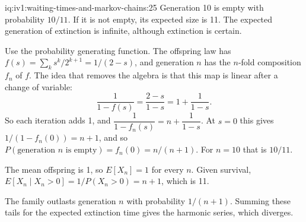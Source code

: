 \begin{solution}{iq:iv1:waiting-times-and-markov-chains:25}
Generation 10 is empty with probability $10/11$. If it is not empty, its expected size is 11. The expected generation of extinction is infinite, although extinction is certain.

Use the probability generating function. The offspring law has $f(s) = \sum_k s^k/2^{k+1} = 1/(2 - s)$, and generation $n$ has the $n$-fold composition $f_n$ of $f$. The idea that removes the algebra is that this map is linear after a change of variable:
\[
\frac{1}{1 - f(s)} = \frac{2 - s}{1 - s} = 1 + \frac{1}{1 - s}.
\]
So each iteration adds 1, and $\dfrac{1}{1 - f_n(s)} = n + \dfrac{1}{1 - s}$. At $s = 0$ this gives $1/(1 - f_n(0)) = n + 1$, and so $P(\text{generation } n \text{ is empty}) = f_n(0) = n/(n+1)$. For $n = 10$ that is $10/11$.

The mean offspring is 1, so $E[X_n] = 1$ for every $n$. Given survival, $E[X_n \mid X_n > 0] = 1/P(X_n > 0) = n + 1$, which is 11.

The family outlasts generation $n$ with probability $1/(n + 1)$. Summing these tails for the expected extinction time gives the harmonic series, which diverges.

\end{solution}
